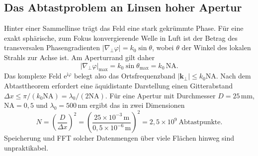 \documentclass[11pt,a4paper]{scrartcl}
\theoremstyle{insightstyle}
\newcommand{\ii}{\mathrm{i}}
\newcommand{\ee}{\mathrm{e}}
\newcommand{\grad}{\nabla_{\!\perp}}
\newcommand{\kp}{\bm{k}_\perp}
\newcommand{\NA}{\mathrm{NA}}
\begin{document}
\subsection{Das Abtastproblem an Linsen hoher Apertur}\label{sec:sampling}
Hinter einer Sammellinse trägt das Feld eine stark gekrümmte Phase. Für eine exakt sphärische, zum Fokus konvergierende Welle in Luft ist der Betrag des transversalen Phasengradienten $|\grad\varphi| = k_0\sin\theta$, wobei $\theta$ der Winkel des lokalen Strahls zur Achse ist. Am Aperturrand gilt daher
\begin{equation}
    |\grad\varphi|_{\max} = k_0\sin\theta_{\max} = k_0\,\NA .
\end{equation}
Das komplexe Feld $\ee^{\ii\varphi}$ belegt also das Ortsfrequenzband $|\kp|\le k_0\NA$. Nach dem Abtasttheorem erfordert eine äquidistante Darstellung einen Gitterabstand $\Delta x\le \pi/(k_0\NA) = \lambda_0/(2\NA)$. Für eine Apertur mit Durchmesser $D=25\,\text{mm}$, $\NA=0{,}5$ und $\lambda_0=500\,\text{nm}$ ergibt das in zwei Dimensionen
\begin{equation}
    N = \left(\frac{D}{\Delta x}\right)^2 = \left(\frac{25\times10^{-3}\,\text{m}}{0{,}5\times10^{-6}\,\text{m}}\right)^2 = 2{,}5\times10^{9}\ \text{Abtastpunkte}.
\end{equation}
Speicherung und FFT solcher Datenmengen über viele Flächen hinweg sind unpraktikabel.
\end{document}
